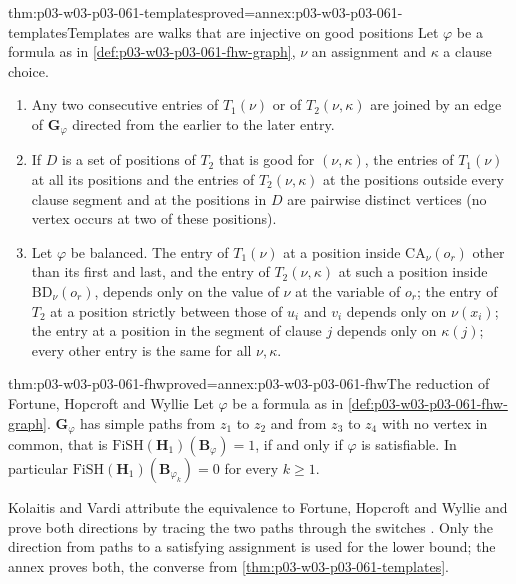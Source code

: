 \begin{hblemma}{thm:p03-w03-p03-061-templates}{proved=annex:p03-w03-p03-061-templates}{Templates are walks that are injective on good positions}
Let \(\varphi\) be a formula as in \cref{def:p03-w03-p03-061-fhw-graph},
\(\nu\) an assignment and \(\kappa\) a clause choice.
\begin{enumerate}
\item Any two consecutive entries of \(T_1(\nu)\) or of \(T_2(\nu,\kappa)\)
      are joined by an edge of \(\mathbf G_\varphi\) directed from the
      earlier to the later entry.
\item If \(D\) is a set of positions of \(T_2\) that is good for
      \((\nu,\kappa)\), the entries of \(T_1(\nu)\) at all its positions and
      the entries of \(T_2(\nu,\kappa)\) at the positions outside every
      clause segment and at the positions in \(D\) are pairwise distinct
      vertices (no vertex occurs at two of these positions).
\item Let \(\varphi\) be balanced. The entry of \(T_1(\nu)\) at a position
      inside \(\mathrm{CA}_\nu(o_r)\) other than its first and last, and the
      entry of \(T_2(\nu,\kappa)\) at such a position inside
      \(\mathrm{BD}_\nu(o_r)\), depends only on the value of \(\nu\) at the
      variable of \(o_r\); the entry of \(T_2\) at a position strictly between
      those of \(u_i\) and \(v_i\) depends only on \(\nu(x_i)\); the entry
      at a position in the segment of clause \(j\) depends only on
      \(\kappa(j)\); every other entry is the same for all \(\nu,\kappa\).
\end{enumerate}
\end{hblemma}

\begin{hbtheorem}{thm:p03-w03-p03-061-fhw}{proved=annex:p03-w03-p03-061-fhw}{The reduction of Fortune, Hopcroft and Wyllie}
Let \(\varphi\) be a formula as in \cref{def:p03-w03-p03-061-fhw-graph}.
\(\mathbf G_\varphi\) has simple paths from \(z_1\) to \(z_2\) and from
\(z_3\) to \(z_4\) with no vertex in common, that is
\(\mathrm{FiSH}(\mathbf H_1)(\mathbf B_\varphi)=1\), if and only if
\(\varphi\) is satisfiable. In particular
\(\mathrm{FiSH}(\mathbf H_1)(\mathbf B_{\varphi_k})=0\) for every \(k\ge1\).
\end{hbtheorem}

Kolaitis and Vardi attribute the equivalence to Fortune, Hopcroft and Wyllie
and prove both directions by tracing the two paths through the switches
\cite[pp.~31--33]{KolaitisVardi1995DatalogManuscript}. Only the direction
from paths to a satisfying assignment is used for the lower bound; the
annex proves both, the converse from \cref{thm:p03-w03-p03-061-templates}.

